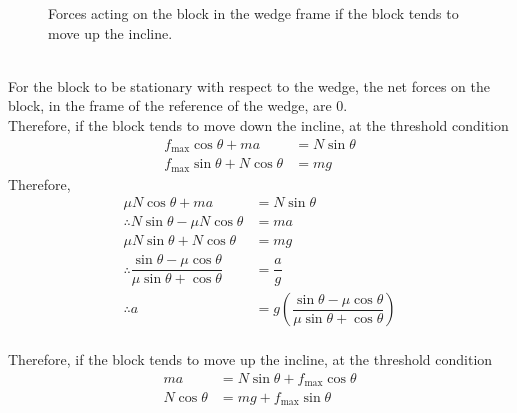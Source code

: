 \documentclass[fleqn, a4paper, 12pt]{amsart}
\theoremstyle{definition}
\theoremstyle{theorem}
\begin{document}
\begin{figure}[H]
	\caption{Forces acting on the block in the wedge frame if the block tends to move up the incline.}
\end{figure}
~\\
For the block to be stationary with respect to the wedge, the net forces on the block, in the frame of the reference of the wedge, are 0.\\
Therefore, if the block tends to move down the incline, at the threshold condition
\begin{align*}
	f_{\text{max}} \cos \theta + m a &= N \sin \theta\\
	f_{\text{max}} \sin \theta + N \cos \theta &= mg
\end{align*}
Therefore,
\begin{align*}
	\mu N \cos \theta + m a &= N \sin \theta\\
	\therefore N \sin \theta - \mu N \cos \theta &= m a\\
	\mu N \sin \theta + N \cos \theta &= mg\\
	\therefore \dfrac{\sin \theta - \mu \cos \theta}{\mu \sin \theta + \cos \theta} &= \dfrac{a}{g}\\
	\therefore a &= g \left( \dfrac{\sin \theta - \mu \cos \theta}{\mu \sin \theta + \cos \theta} \right)
\end{align*}\\
Therefore, if the block tends to move up the incline, at the threshold condition
\begin{align*}
	m a &= N \sin \theta + f_{\text{max}} \cos \theta\\
	N \cos \theta &= mg + f_{\text{max}} \sin \theta
\end{align*}
\end{document}
